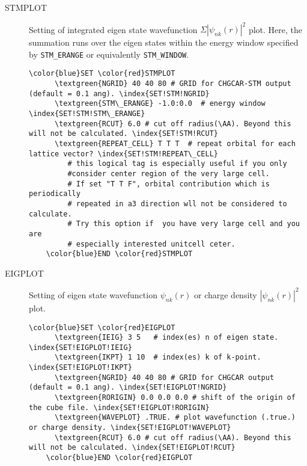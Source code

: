 \documentclass[a4paper,12pt]{scrartcl}
\makeatletter
\def\namedlabel#1#2{\begingroup
    #2%
    \def\@currentlabel{#2}%
    \phantomsection\label{#1}\endgroup
}
\newcommand{\textgreen}[1]{\textcolor{green!50!black}{\texttt{#1}}}
\makeatother
\begin{document}
\begin{description}
	
    \item[\namedlabel{tag:STMPLOT}{STMPLOT}] 
        Setting of integrated eigen state wavefunction $\Sigma |\psi_{nk}(r)|^{2}$ plot.
		Here, the summation runs over the eigen states within the energy window specified
		by \texttt{STM\_ERANGE} or equivalently \texttt{STM\_WINDOW}.

 \begin{Verbatim}[commandchars=\\\{\},gobble=4, frame=single, framesep=2mm, 
    label= STMPLOT setup example,
    labelposition=bottomline]
    \color{blue}SET \color{red}STMPLOT
      \textgreen{NGRID} 40 40 80 # GRID for CHGCAR-STM output (default = 0.1 ang). \index{SET!STM!NGRID}
      \textgreen{STM\_ERANGE} -1.0:0.0  # energy window \index{SET!STM!STM\_ERANGE}
      \textgreen{RCUT} 6.0 # cut off radius(\AA). Beyond this will not be calculated. \index{SET!STM!RCUT}
      \textgreen{REPEAT_CELL} T T T  # repeat orbital for each lattice vector? \index{SET!STM!REPEAT\_CELL}
         # this logical tag is especially useful if you only 
         #consider center region of the very large cell.
         # If set "T T F", orbital contribution which is periodically 
         # repeated in a3 direction wll not be considered to calculate. 
         # Try this option if  you have very large cell and you are 
         # especially interested unitcell ceter.
    \color{blue}END \color{red}STMPLOT
 \end{Verbatim}

    \item[\namedlabel{tag:EIGPLOT}{EIGPLOT}] 
        Setting of eigen state wavefunction $\psi_{nk}(r)$ or 
		charge density $|\psi_{nk}(r)|^{2}$ plot.

 \begin{Verbatim}[commandchars=\\\{\},gobble=4, frame=single, framesep=2mm, 
    label= EIGPLOT setup example,
    labelposition=bottomline]
    \color{blue}SET \color{red}EIGPLOT
      \textgreen{IEIG} 3 5   # index(es) n of eigen state. \index{SET!EIGPLOT!IEIG}
      \textgreen{IKPT} 1 10  # index(es) k of k-point. \index{SET!EIGPLOT!IKPT}
      \textgreen{NGRID} 40 40 80 # GRID for CHGCAR output (default = 0.1 ang). \index{SET!EIGPLOT!NGRID}
      \textgreen{RORIGIN} 0.0 0.0 0.0 # shift of the origin of the cube file. \index{SET!EIGPLOT!RORIGIN}
      \textgreen{WAVEPLOT} .TRUE. # plot wavefunction (.true.) or charge density. \index{SET!EIGPLOT!WAVEPLOT}
      \textgreen{RCUT} 6.0 # cut off radius(\AA). Beyond this will not be calculated. \index{SET!EIGPLOT!RCUT}
    \color{blue}END \color{red}EIGPLOT
 \end{Verbatim}



\end{description}
\end{document}
